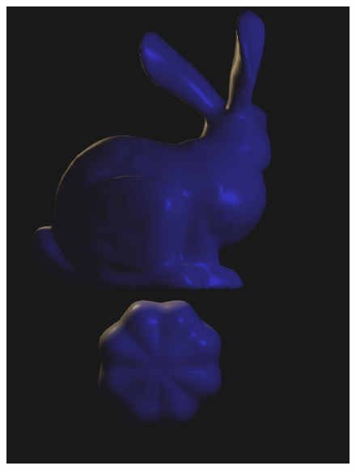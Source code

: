 \documentclass[acmtog]{acmart}
\begin{document}
\begin{figure}[h]
{\begin{minipage}[b]{.4\linewidth}
		\includegraphics[scale=0.25]{back.png}
	\end{minipage}
}
\\
\end{figure}
\end{document}
